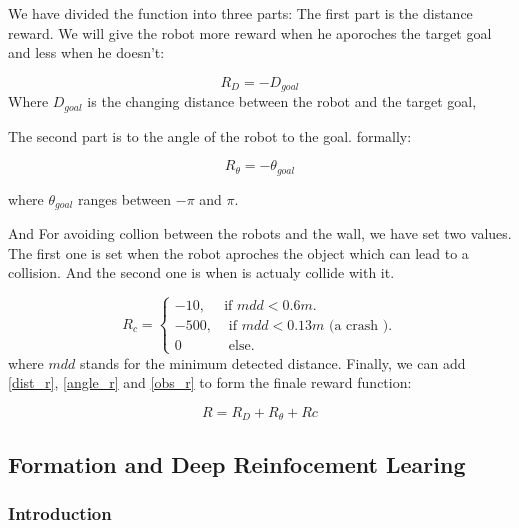 \documentclass[12pt]{extarticle}
\begin{document}
We have   divided  the function into three parts:
The first part is  the distance reward. We will give the robot more reward when he aporoches the target goal and less when he doesn't:
   
\setcounter{equation}{0}

       \begin{equation} \label{dist_r}
     R_{D}=-D_{goal}
   \end{equation}
 Where $D_{goal}$  is the changing distance between the robot and the target goal,
    
The second part is to the angle of the robot to the goal. formally:



     \begin{equation} \label{angle_r}
     R_{\theta}=-\theta_{goal}
   \end{equation}
 
 where $\theta_{goal}$  ranges  between $-\pi$  and $\pi$.
  
And For avoiding collion between the robots and the wall, we have set two values. The first one is set  when the robot aproches the object which can lead to a collision. And the second one is when is actualy collide  with it.


\begin{equation}  \label{obs_r}
  R_{c}=\begin{cases}
    -10, & \text{if $mdd< 0.6m$}.\\
    -500 , & \text{ if $mdd <0.13m$ (a crash )}.\\
    0 & \text{ else}.
  \end{cases}
\end{equation}
where $mdd$ stands for the minimum detected distance.\linebreak
Finally, we can add \ref{dist_r}, \ref{angle_r} and \ref{obs_r} to form the finale reward function: 

 
    \begin{equation} \label{final_r}
     R=R_{D}+R_{\theta}+R{c}
   \end{equation}






\subsection{Formation and Deep Reinfocement Learing}
\subsubsection{Introduction}
\end{document}

